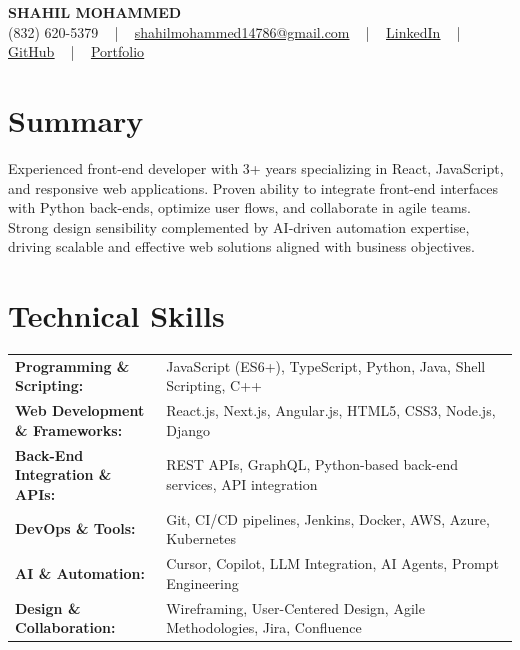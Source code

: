 \documentclass[letterpaper,11pt]{article}
\begin{document}
\begin{center}
    {\fontsize{14pt}{12pt}\selectfont \textbf{\MakeUppercase{Shahil Mohammed}}}\\ \vspace{2pt}
    \fontsize{10pt}{12pt}\selectfont (832) 620-5379 ~ | ~ \href{mailto:shahilmohammed14786@gmail.com}{shahilmohammed14786@gmail.com} ~ | ~  
    \href{https://www.linkedin.com/in/shahil-mohammed-9652931a1/}{\color{blue}\underline{LinkedIn}}  ~ | ~ 
    \href{https://github.com/freakbeast14}{\color{blue}\underline{GitHub}} ~ | ~ 
    \href{https://shahil-mohammed.netlify.app/}{\color{blue}\underline{Portfolio}}
    \vspace{-8pt}
\end{center}

\section{Summary}
\fontsize{9pt}{10pt}\selectfont
Experienced front-end developer with 3+ years specializing in React, JavaScript, and responsive web applications. Proven ability to integrate front-end interfaces with Python back-ends, optimize user flows, and collaborate in agile teams. Strong design sensibility complemented by AI-driven automation expertise, driving scalable and effective web solutions aligned with business objectives.  
 \vspace{-5pt}
 
\section{Technical Skills}
        \vspace{-14pt}
        \begin{table}[h]
            \fontsize{9pt}{10pt}\selectfont
            \begin{tabular}{p{0.3\linewidth} p{0.7\linewidth}}
                \textbf{Programming \& Scripting:} & JavaScript (ES6+), TypeScript, Python, Java, Shell Scripting, C++ \\
                \textbf{Web Development \& Frameworks:} & React.js, Next.js, Angular.js, HTML5, CSS3, Node.js, Django \\
                \textbf{Back-End Integration \& APIs:} & REST APIs, GraphQL, Python-based back-end services, API integration \\
                \textbf{DevOps \& Tools:} & Git, CI/CD pipelines, Jenkins, Docker, AWS, Azure, Kubernetes \\
                \textbf{AI \& Automation:} & Cursor, Copilot, LLM Integration, AI Agents, Prompt Engineering \\
                \textbf{Design \& Collaboration:} & Wireframing, User-Centered Design, Agile Methodologies, Jira, Confluence \\
            \end{tabular}
        \end{table}
 \vspace{-15pt}
 
\end{document}
